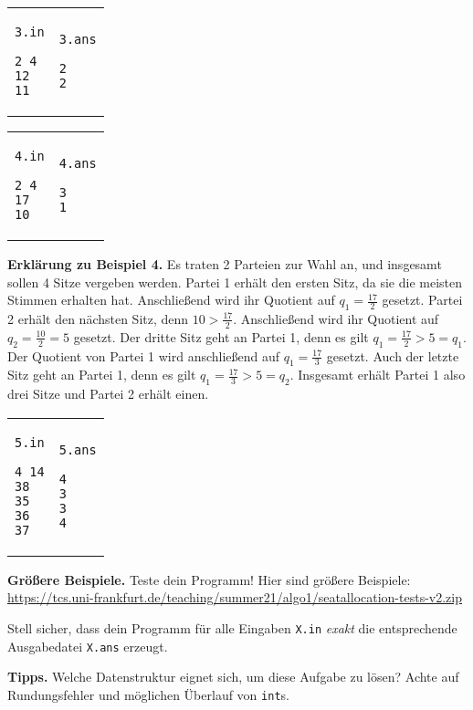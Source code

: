 \documentclass{uebung_cs}
\begin{document}
\begin{tabular}{p{}p{}}
\texttt{3.in}
\begin{verbatim}
2 4
12
11
\end{verbatim}
&
\texttt{3.ans}
\begin{verbatim}
2
2
\end{verbatim}
\end{tabular}

\begin{tabular}{p{}p{}}
\texttt{4.in}
\begin{verbatim}
2 4
17
10
\end{verbatim}
&
\texttt{4.ans}
\begin{verbatim}
3
1
\end{verbatim}
\end{tabular}

\textbf{Erklärung zu Beispiel 4.}
Es traten 2 Parteien zur Wahl an, und insgesamt sollen 4 Sitze vergeben werden.
Partei 1 erhält den ersten Sitz, da sie die meisten Stimmen erhalten hat. 
Anschließend wird ihr Quotient auf $q_1 = \frac{17}{2}$ gesetzt.
Partei 2 erhält den nächsten Sitz, denn $10 > \frac{17}{2}$.
Anschließend wird ihr Quotient auf $q_2 = \frac{10}{2} = 5$ gesetzt.
Der dritte Sitz geht an Partei 1, denn es gilt $q_1 = \frac{17}{2} > 5 = q_1$.
Der Quotient von Partei 1 wird anschließend auf $q_1 = \frac{17}{3}$ gesetzt.
Auch der letzte Sitz geht an Partei 1, denn es gilt $q_1 = \frac{17}{3} > 5 = q_2$.
Insgesamt erhält Partei 1 also drei Sitze und Partei 2 erhält einen.

\begin{tabular}{p{}p{}}
\texttt{5.in}
\begin{verbatim}
4 14
38
35
36
37
\end{verbatim}
&
\texttt{5.ans}
\begin{verbatim}
4
3
3
4
\end{verbatim}
\end{tabular}

\textbf{Größere Beispiele.}
Teste dein Programm! Hier sind größere Beispiele:
\url{https://tcs.uni-frankfurt.de/teaching/summer21/algo1/seatallocation-tests-v2.zip}

Stell sicher, dass dein Programm für alle Eingaben \texttt{X.in} \emph{exakt} die entsprechende Ausgabedatei \texttt{X.ans} erzeugt.

\textbf{Tipps.}
Welche Datenstruktur eignet sich, um diese Aufgabe zu lösen? Achte auf Rundungsfehler und möglichen Überlauf von \texttt{int}s.
\end{document}
